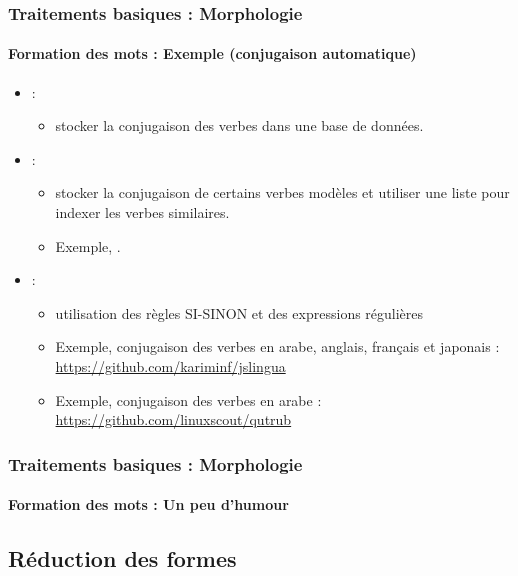 \documentclass[xcolor=table]{beamer}
\begin{document}
\begin{frame}
\frametitle{Traitements basiques : Morphologie}
\framesubtitle{Formation des mots : Exemple (conjugaison automatique)}

\begin{itemize}
	\item {} :
	\begin{itemize}
		\item stocker la conjugaison des verbes dans une base de données.
	\end{itemize}
	\item {} :
	\begin{itemize}
		\item stocker la conjugaison de certains verbes modèles et utiliser une liste pour indexer les verbes similaires.
		\item Exemple, .
	\end{itemize}
	\item {} :
	\begin{itemize}
		\item utilisation des règles SI-SINON et des expressions régulières
		\item Exemple, conjugaison des verbes en arabe, anglais, français et japonais : \url{https://github.com/kariminf/jslingua}
		\item Exemple, conjugaison des verbes en arabe : \url{https://github.com/linuxscout/qutrub}
	\end{itemize}
\end{itemize}

\end{frame}

\begin{frame}
\frametitle{Traitements basiques : Morphologie}
\framesubtitle{Formation des mots : Un peu d'humour}

\begin{center}
\end{center}

\end{frame}

\subsection{Réduction des formes}
\end{document}
